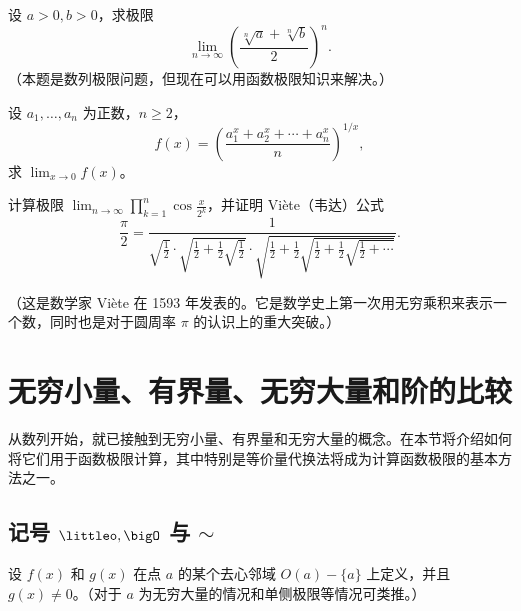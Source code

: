 \begin{xexercise}[3]
设 $a>0,b>0$，求极限
  \[
    \lim_{n\to\infty}\left(\frac{\sqrt[n]{a}+\sqrt[n]{b}}2\right)^n.
  \]
  （本题是数列极限问题，但现在可以用函数极限知识来解决。）
\end{xexercise}

\begin{xexercise}[4]
设 $a_1,\ldots,a_n$ 为正数，$n\geq2$，
  \[
    f(x)=\left(\frac{a_1^x+a_2^x+\cdots+a_n^x}{n}\right)^{1/x},
  \]
  求 $\displaystyle\lim_{x\to0}f(x)$。
\end{xexercise}

\begin{xexercise}[5]
计算极限 $\displaystyle\lim_{n\to\infty}\prod_{k=1}^n\cos\frac{x}{2^k}$，并证明 Viète（韦达）公式
  \[
    \frac\pi2=
    \frac{1}{
      \sqrt{\frac12}\cdot
      \sqrt{\frac12+\frac12\sqrt{\frac12}}\cdot
      \sqrt{\frac12+\frac12\sqrt{\frac12+\frac12\sqrt{\frac12+\cdots}}}}
    .
  \]

  （这是数学家 Viète 在 1593 年发表的。它是数学史上第一次用无穷乘积来表示一个数，同时也是对于圆周率 $\pi$ 的认识上的重大突破。）
\end{xexercise}

\section{无穷小量、有界量、无穷大量和阶的比较}

从数列开始，就已接触到无穷小量、有界量和无穷大量的概念。在本节将介绍如何将它们用于函数极限计算，其中特别是等价量代换法将成为计算函数极限的基本方法之一。

\subsection{\texorpdfstring{记号 $\littleo,\bigO$ 与 $\sim$}{记号 o、O 与渐近等价}}

设 $f(x)$ 和 $g(x)$ 在点 $a$ 的某个去心邻域 $O(a)-\{a\}$ 上定义，并且 $g(x)\ne0$。（对于 $a$ 为无穷大量的情况和单侧极限等情况可类推。）

